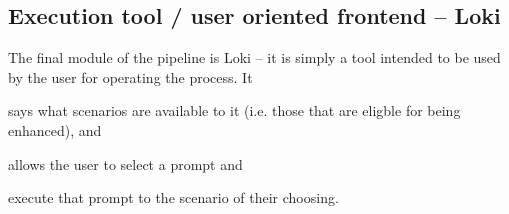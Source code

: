 \subsection{Execution tool / user oriented frontend -- Loki}


The final module of the \hefe pipeline is Loki -- it is simply a tool intended
to be used by the user for operating the process. It \begin{inparaenum}
    \item  says what scenarios are available to it (i.e. those that are eligble for
    being enhanced), and
    \item allows the user to select a prompt and
    \item execute that prompt to the scenario of their choosing.
\end{inparaenum}


